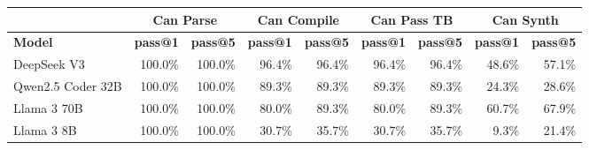 \begin{tabular}{l|rr|rr|rr|rr}
\cmidrule[\heavyrulewidth]{2-9}
 & \multicolumn{2}{c|}{\textbf{Can Parse}} & \multicolumn{2}{c|}{\textbf{Can Compile}} & \multicolumn{2}{c|}{\textbf{Can Pass TB}} & \multicolumn{2}{c}{\textbf{Can Synth}} \\
\midrule
 \textbf{Model} & \textbf{pass@1} & \textbf{pass@5} & \textbf{pass@1} & \textbf{pass@5} & \textbf{pass@1} & \textbf{pass@5} & \textbf{pass@1} & \textbf{pass@5} \\
\midrule
DeepSeek V3 & 100.0\% & 100.0\% & 96.4\% & 96.4\% & 96.4\% & 96.4\% & 48.6\% & 57.1\% \\
Qwen2.5 Coder 32B & 100.0\% & 100.0\% & 89.3\% & 89.3\% & 89.3\% & 89.3\% & 24.3\% & 28.6\% \\
Llama 3 70B & 100.0\% & 100.0\% & 80.0\% & 89.3\% & 80.0\% & 89.3\% & 60.7\% & 67.9\% \\
Llama 3 8B & 100.0\% & 100.0\% & 30.7\% & 35.7\% & 30.7\% & 35.7\% & 9.3\% & 21.4\% \\
\bottomrule
\end{tabular}